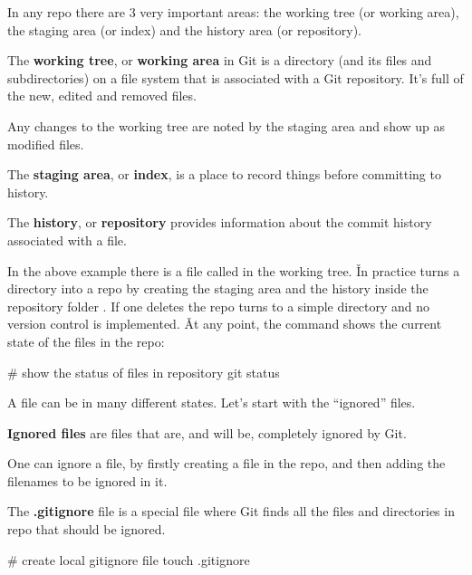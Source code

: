 In any repo there are 3 very important areas: the working tree (or working area), the staging area (or index) and the
history area (or repository).

The \textbf{working tree}, or \textbf{working area} in Git is a directory (and its files and subdirectories) on a
file system that is associated with a Git repository. It's full of the new, edited and removed files.
\ed

Any changes to the working tree are noted by the staging area and show up as modified files.

The \textbf{staging area}, or \textbf{index}, is a place to record things before committing to history.
\ed

The \textbf{history}, or \textbf{repository} provides information about the commit history associated with a file.
\ed


In the above example there is a file called  in the working tree. \v

In practice  turns a directory into a repo by creating the staging area and the history inside the
repository folder . If one deletes  the repo turns to a simple directory and no version control
is implemented. \v

At any point, the  command shows the current state of the files in the repo:

\begin{bash}
# show the status of files in repository
git status
\end{bash}

A file can be in many different states. Let's start with the ``ignored'' files.

\textbf{Ignored files} are files that are, and will be, completely ignored by Git.
\ed

One can ignore a file, by firstly creating a  file in the repo, and then adding the filenames to be
ignored in it.

\bd[.gitignore]
The \textbf{.gitignore} file is a special file where Git finds all the files and directories in repo that should be
ignored.
\ed

\begin{bash}
# create local gitignore file
touch .gitignore
\end{bash}

